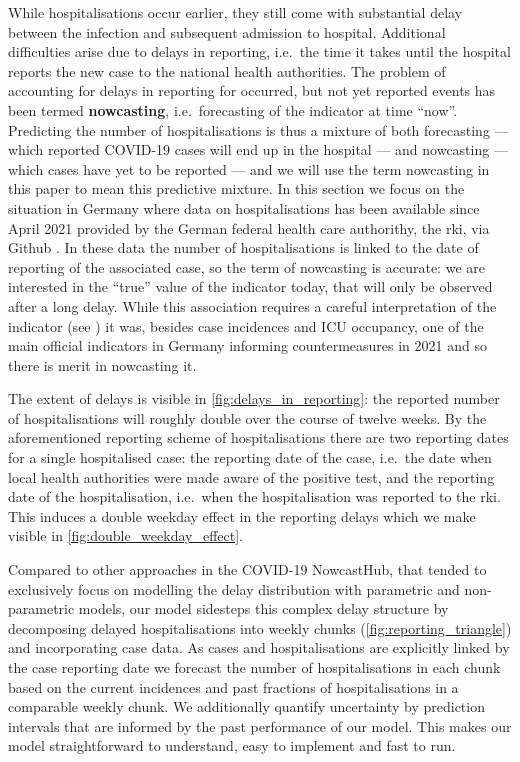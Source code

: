 While hospitalisations occur earlier, they still come with substantial delay between the infection and subsequent admission to hospital. Additional difficulties arise due to delays in reporting, i.e.~the time it takes until the hospital reports the new case to the national health authorities. The problem of accounting for delays in reporting for occurred, but not yet reported events has been termed \textbf{nowcasting}, i.e.~forecasting of the indicator at time ``now''. Predicting the number of hospitalisations is thus a mixture of both forecasting --- which reported COVID-19 cases will end up in the hospital --- and nowcasting --- which cases have yet to be reported --- and we will use the term nowcasting in this paper to mean this predictive mixture. In this section we focus on the situation in Germany where data on hospitalisations has been available since April 2021 provided by the German federal health care authorithy, the \gls{rki}, via Github \cite{RobertKoch-Institut2021COVID19Hospitalisierungen}. In these data the number of hospitalisations is linked to the date of reporting of the associated case, so the term of nowcasting is accurate: we are interested in the ``true'' value of the indicator today, that will only be observed after a long delay. While this association requires a careful interpretation of the indicator (see ) it was, besides case incidences and ICU occupancy, one of the main official indicators in Germany informing countermeasures in 2021 and so there is merit in nowcasting it. 

The extent of delays is visible in \cref{fig:delays_in_reporting}: the reported number of hospitalisations will roughly double over the course of twelve weeks. By the aforementioned reporting scheme of hospitalisations there are two reporting dates for a single hospitalised case: the reporting date of the case, i.e.~the date when local health authorities were made aware of the positive test, and the reporting date of the hospitalisation, i.e.~when the hospitalisation was reported to the \gls{rki}. This induces a double weekday effect in the reporting delays which we make visible in \cref{fig:double_weekday_effect}.

Compared to other approaches in the COVID-19 NowcastHub, that tended to exclusively focus on modelling the delay distribution with parametric and non-parametric models, our model sidesteps this complex delay structure by decomposing delayed hospitalisations into weekly chunks (\cref{fig:reporting_triangle}) and incorporating case data. As cases and hospitalisations are explicitly linked by the case reporting date we forecast the number of hospitalisations in each chunk based on the current incidences and past fractions of hospitalisations in a comparable weekly chunk. We additionally quantify uncertainty by prediction intervals that are informed by the past performance of our model. This makes our model straightforward to understand, easy to implement and fast to run.

